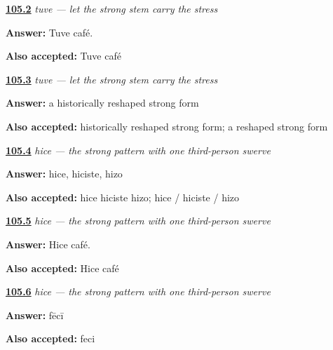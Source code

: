 \noindent\begin{minipage}[t]{\linewidth}
\raggedright
\hyperlink{review-ES-C15-tener-preterite-tuve-cafe}{\textbf{105.2}} \emph{tuve — let the strong stem carry the stress}\par
\small \textbf{Answer:} Tuve café.\par
\footnotesize \textbf{Also accepted:} Tuve café
\end{minipage}\par\medskip

\noindent\begin{minipage}[t]{\linewidth}
\raggedright
\hyperlink{review-ES-C15-tener-preterite-history}{\textbf{105.3}} \emph{tuve — let the strong stem carry the stress}\par
\small \textbf{Answer:} a historically reshaped strong form\par
\footnotesize \textbf{Also accepted:} historically reshaped strong form; a reshaped strong form
\end{minipage}\par\medskip

\noindent\begin{minipage}[t]{\linewidth}
\raggedright
\hyperlink{review-ES-C15-hacer-preterite-singular-forms}{\textbf{105.4}} \emph{hice — the strong pattern with one third-person swerve}\par
\small \textbf{Answer:} hice, hiciste, hizo\par
\footnotesize \textbf{Also accepted:} hice hiciste hizo; hice / hiciste / hizo
\end{minipage}\par\medskip

\noindent\begin{minipage}[t]{\linewidth}
\raggedright
\hyperlink{review-ES-C15-hacer-preterite-hice-cafe}{\textbf{105.5}} \emph{hice — the strong pattern with one third-person swerve}\par
\small \textbf{Answer:} Hice café.\par
\footnotesize \textbf{Also accepted:} Hice café
\end{minipage}\par\medskip

\noindent\begin{minipage}[t]{\linewidth}
\raggedright
\hyperlink{review-ES-C15-hacer-preterite-history}{\textbf{105.6}} \emph{hice — the strong pattern with one third-person swerve}\par
\small \textbf{Answer:} fēcī\par
\footnotesize \textbf{Also accepted:} feci
\end{minipage}\par\medskip

